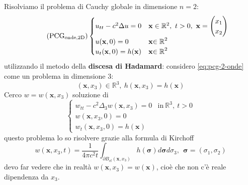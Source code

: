 \documentclass[10pt,a4paper,twoside,openright]{book}
\newcommand{\x}{\mathbf{x}}
\begin{document}
Risolviamo il problema di Cauchy globale in dimensione $\displaystyle n=2$:
\begin{equation*}
	\tag{PCG$_{\text{onde,2D}}$}
	\begin{cases}
		u_{tt} -c^{2} \Delta u=0            & \x \in \mathbb{R}^{2} ,\ t >0,\ \x = 
		\begin{pmatrix}
		x_{1}\\
		x_{2}
		\end{pmatrix}\\
		u(\x ,0) =0                 & \x\mathbb{\in R}^{2}                         \\
		u_{t}(\x ,0) =h(\x) & \x\mathbb{\in R}^{2}                         
	\end{cases}
	\label{eq:pcg-2-onde}
\end{equation*}
utilizzando il metodo della \textbf{discesa di Hadamard}: considero \eqref{eq:pcg-2-onde} come un problema in dimensione $\displaystyle 3$:
\begin{equation}
	(\x ,x_{3}) \in \mathbb{R}^{3} ,\ h(\x ,x_{3}) =h(\x)
\end{equation}
Cerco $\displaystyle w=w(\x ,x_{3})$ soluzione di
\begin{equation*}
	\begin{cases}
		w_{tt} -c^{2} \Delta _{3} w(\x ,x_{3}) =0 & \text{in} \ \mathbb{R}^{3} ,\ t >0 \\
		w(\x ,x_{3} ,0) =0                        &                                    \\
		w_{t}(\x ,x_{3} ,0) =h(\x)        &                                    
	\end{cases}
\end{equation*}
questo problema lo so risolvere grazie alla formula di Kirchoff
\begin{equation*}
	w(\x ,x_{3} ,t) =\frac{1}{4\pi c^{2} t}\int _{\partial B_{ct}(\x ,x_{3})} h(\bm{\sigma }) d\bm{\sigma } d\sigma _{3} ,\ \ \bm{\sigma } =( \sigma _{1} ,\sigma _{2})
\end{equation*}
devo far vedere che in realtà $\displaystyle w(\x ,x_{3}) =w(\x)$, cioè che non c'è reale dipendenza da $\displaystyle x_{3}$.
\end{document}
